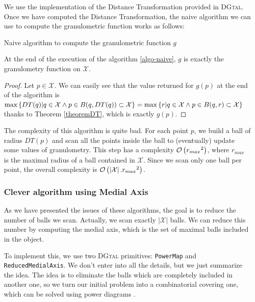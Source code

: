 We use the implementation of the Distance Transformation provided in \textsc{DGtal}. Once we have computed the Distance Transformation, the naive algorithm we can use to compute the granulometric function works as follows:

\IncMargin{1em}
\begin{algorithm}
\caption{Naive algorithm to compute the granulometric function $g$}
\label{algo-naive}
\end{algorithm}

\begin{theoreme}
	At the end of the execution of the algorithm \ref{algo-naive}, $g$ is exactly the granulometry function on $\mathcal{X}$.
\end{theoreme}

\begin{proof}
Let $p \in \mathcal{X}$. We can easily see that the value returned for $g(p)$ at the end of the algorithm is 
$ \operatorname{max} \left\{ DT(q) | q \in \mathcal{X} \wedge p \in B(q,DT(q)) \subset \mathcal{X} \right\} 
= \operatorname{max} \left\{ r | q \in \mathcal{X} \wedge p \in B(q,r) \subset \mathcal{X} \right\}$ thanks to Theorem \ref{theoremDT}, which is exactly $g(p)$.
\end{proof}

The complexity of this algorithm is quite bad. For each point $p$, we build a ball of radius $DT(p)$ and scan all the points inside the ball to (eventually) update some values of granulometry. This step has a complexity $\mathcal O \left( {r_{max}}^2 \right)$, where $r_{max}$ is the maximal radius of a ball contained in $\mathcal{X}$. Since we scan only one ball per point, the overall complexity is $\mathcal O \left( \left| \mathcal{X} \right|. {r_{max}}^2 \right)$.

\subsubsection{Clever algorithm using Medial Axis}

As we have presented the issues of these algorithms, the goal is to reduce the number of balls we scan. Actually, we scan exactly $\left| \mathcal{X} \right|$ balls. We can reduce this number by computing the medial axis, which is the set of maximal balls included in the object.

To implement this, we use two \textsc{DGtal} primitives: \texttt{PowerMap} and \texttt{ReducedMedialAxis}. We don't enter into all the details, but we just summarize the idea. The idea is to eliminate the balls which are completely included in another one, so we turn our initial problem into a combinatorial covering one, which can be solved using power diagrams \cite{DMA-extraction}.


